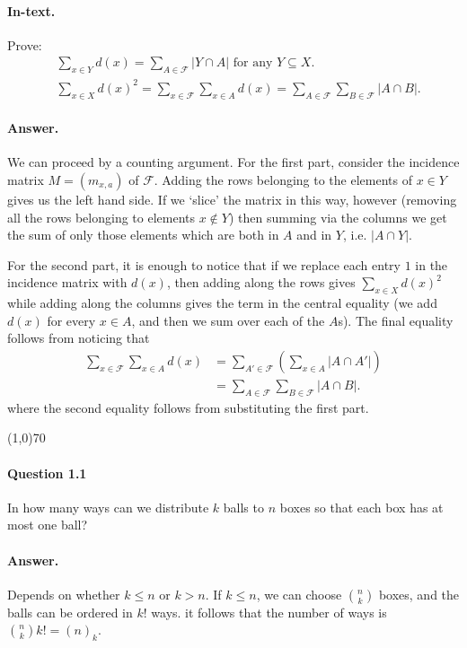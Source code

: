\paragraph{In-text.} Prove:
\begin{align}
	&\sum_{x\in Y} d(x)=\sum_{A\in\mathcal{F}}|Y\cap A| \text{ for any } Y\subseteq X.\\
	&\sum_{x\in X}d(x)^2=\sum_{x\in\mathcal{F}}\sum_{x\in A}d(x)=\sum_{A\in\mathcal{F}}\sum_{B\in\mathcal{F}}|A\cap B|.
\end{align}

\paragraph{Answer.} We can proceed by a counting argument. For the first part, consider the incidence matrix $M=(m_{x,a})$ of $\mathcal{F}$. Adding the rows belonging to the elements of $x\in Y$ gives us the left hand side. If we `slice' the matrix in this way, however (removing all the rows belonging to elements $x\notin Y$) then summing via the columns we get the sum of only those elements which are both in $A$ and in $Y$, i.e. $|A\cap Y|$.

For the second part, it is enough to notice that if we replace each entry $1$ in the incidence matrix with $d(x)$, then adding along the rows gives $\sum_{x\in X}d(x)^2$ while adding along the columns gives the term in the central equality (we add $d(x)$ for every $x\in A$, and then we sum over each of the $A$s). The final equality follows from noticing that
\begin{align*}
	\sum_{x\in\mathcal{F}}\sum_{x\in A}d(x)&=\sum_{A'\in\mathcal{F}}\left(\sum_{x\in A}|A\cap A'|\right)\\
	&=\sum_{A\in\mathcal{F}}\sum_{B\in\mathcal{F}}|A\cap B|.
\end{align*}
where the second equality follows from substituting the first part.


\begin{center}
	\line(1,0){70}
\end{center}

\paragraph{Question 1.1} In how many ways can we distribute $k$ balls to $n$ boxes so that each box has at most one ball?

\paragraph{Answer.} Depends on whether $k\leq n$ or $k>n$. If $k\leq n$, we can choose $\binom{n}{k}$ boxes, and the balls can be ordered in $k!$ ways. it follows that the number of ways is $\binom{n}{k}k!=(n)_k$.


